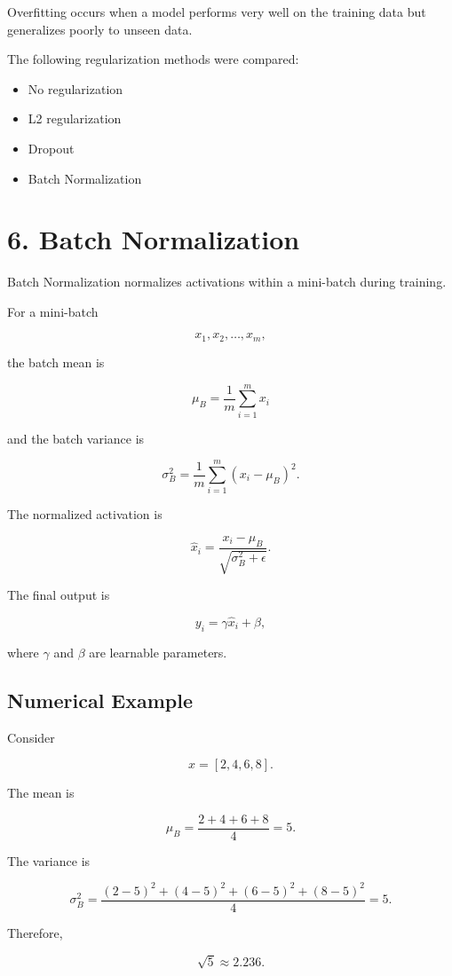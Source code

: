 \documentclass[10pt]{article}
\begin{document}
Overfitting occurs when a model performs very well on the training data
but generalizes poorly to unseen data.

The following regularization methods were compared:

\begin{itemize}
\item No regularization
\item L2 regularization
\item Dropout
\item Batch Normalization
\end{itemize}

\section*{6. Batch Normalization}

Batch Normalization normalizes activations within a mini-batch during
training.

For a mini-batch

\[
x_1,x_2,\ldots,x_m,
\]

the batch mean is

\[
\mu_B=\frac{1}{m}\sum_{i=1}^{m}x_i
\]

and the batch variance is

\[
\sigma_B^2=
\frac{1}{m}\sum_{i=1}^{m}(x_i-\mu_B)^2.
\]

The normalized activation is

\[
\hat{x}_i=
\frac{x_i-\mu_B}
{\sqrt{\sigma_B^2+\epsilon}}.
\]

The final output is

\[
y_i=\gamma\hat{x}_i+\beta,
\]

where $\gamma$ and $\beta$ are learnable parameters.

\subsection*{Numerical Example}

Consider

\[
x=[2,4,6,8].
\]

The mean is

\[
\mu_B=\frac{2+4+6+8}{4}=5.
\]

The variance is

\[
\sigma_B^2=
\frac{(2-5)^2+(4-5)^2+(6-5)^2+(8-5)^2}{4}
=5.
\]

Therefore,

\[
\sqrt{5}\approx2.236.
\]
\end{document}
